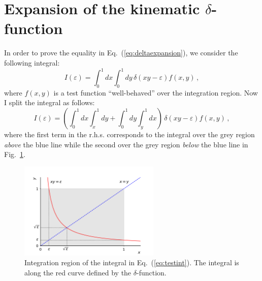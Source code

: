 \documentclass[10pt,a4paper]{article}
\begin{document}
\section{Expansion of the kinematic $\delta$-function}\label{sec:deltaexpansion}

In order to prove the equality in Eq.~(\ref{eq:deltaexpansion}), we
consider the following integral:
\begin{equation}\label{eq:testint}
I(\varepsilon) =\int_0^1 dx \int_0^1 dy\,\delta(xy-\varepsilon) f(x,y)\,,
\end{equation}
where $f(x,y)$ is a test function ``well-behaved'' over the
integration region. Now I split the integral as follows:
\begin{equation}
I(\varepsilon) =\left(\int_0^1 dx \int_x^1 dy+\int_0^1 dy \int_y^1 dx\right)\,\delta(xy-\varepsilon) f(x,y)\,,
\end{equation}
where the first term in the r.h.s. corresponds to the integral over
the grey region \textit{above} the blue line while the second over the
grey region \textit{below} the blue line in
Fig.~\ref{fig:deltaexpansion}.
\begin{figure}[t]
  \begin{centering}
    \includegraphics[width=0.6\textwidth]{plots/DeltaExpansion}
    \caption{Integration region of the integral in 
      Eq.~(\ref{eq:testint}). The integral is along the red curve 
      defined by the $\delta$-function.\label{fig:deltaexpansion}}
  \end{centering}
\end{figure}
\end{document}
